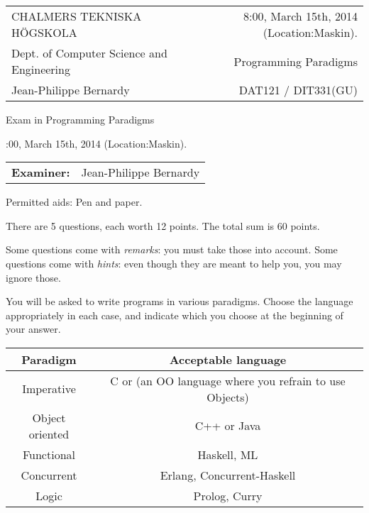 \documentclass{article}
\begin{document}
\setlength{\parskip}{2pt}

\newcommand{\examtime}{8:00, March 15th, 2014  (Location:Maskin)}
\newcommand{\points}[1]{\marginpar{\bf #1 points}}
\noindent
\begin{tabular}{lr}
CHALMERS TEKNISKA H\"OGSKOLA &\examtime{}.\\
Dept. of Computer Science and Engineering & Programming Paradigms\\
Jean-Philippe Bernardy                 & DAT121 / DIT331(GU) \\
\end{tabular}

\vspace{2.5cm} \noindent
\begin{center} {\LARGE
Exam in Programming Paradigms}
\end{center}

\vspace{1.5cm}

\noindent
\examtime{}.\\
\begin{tabular}{ll}
\textbf{Examiner:} & Jean-Philippe Bernardy
\end{tabular}
\vspace{1cm}

\noindent
Permitted aids: Pen and paper.

There are 5 questions, each worth 12 points. The total sum is 60
points.

Some questions come with \emph{remarks}: you must take those
into account.
Some questions come with \emph{hints}: even though they are meant to help you, you may ignore those.

You will be asked to write programs in various paradigms. Choose the
language appropriately in each case, and indicate which you choose at
the beginning of your answer.

\begin{tabular}[p]{cc}
  Paradigm & Acceptable language \\ \hline
  Imperative   & C or (an OO language where you refrain to use Objects) \\
  Object oriented & C++ or Java \\
  Functional & Haskell, ML \\
  Concurrent & Erlang, Concurrent-Haskell \\
  Logic & Prolog, Curry
\end{tabular}
\end{document}
